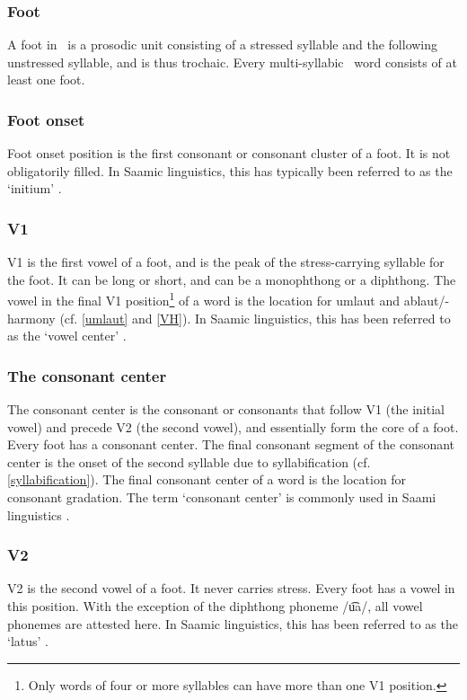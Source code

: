 \subsubsection{Foot}\label{foot}
A {foot} in \PS\ is a prosodic unit consisting of a stressed syllable and the following unstressed syllable, and is thus trochaic. Every multi-syllabic \PS\ word consists of at least one foot. 

\subsubsection{Foot onset}\label{footOnset}
{Foot onset} position is the first consonant or consonant cluster of a foot. It is not obligatorily filled. 
In Saamic linguistics, this has typically been referred to as the ‘initium’ \citep[cf.][39]{Sammallahti1998}.

\subsubsection{V1}\label{v1}
{V1} is the first vowel of a foot, and is the peak of the stress-carrying syllable for the foot. It can be long or short, and can be a monophthong or a diphthong. The vowel in the final V1 position\footnote{Only words of four or more syllables can have more than one V1 position.}
 of a word is the location for umlaut and ablaut/-harmony (cf. \SEC\ref{umlaut} and \SEC\ref{VH}). 
In Saamic linguistics, this has been referred to as the ‘vowel center’ \citep[cf.][39]{Sammallahti1998}.

\subsubsection{The consonant center}\label{CCent}
The {consonant center} is the consonant or consonants that follow V1 (the initial vowel) and precede V2 (the second vowel), and essentially form the core 
of a foot. Every foot has a consonant center. The final consonant segment of the consonant center is the onset of the second syllable due to syllabification (cf. \SEC\ref{syllabification}). The final consonant center of a word is the location for consonant gradation. The term ‘consonant center’ is commonly used in Saami linguistics \citep[cf.][39]{Sammallahti1998}. 

\subsubsection{V2}\label{v2}
{V2} is the second vowel of a foot. It never carries stress. Every foot has a vowel in this position. With the exception of the diphthong phoneme /u͡a/, all vowel phonemes are attested here. 
In Saamic linguistics, this has been referred to as the ‘latus’ \citep[cf.][39]{Sammallahti1998}.

